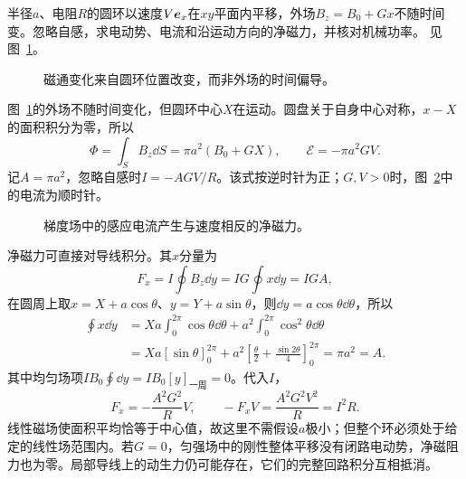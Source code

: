 \begin{exercise}[在静态梯度磁场中平移的圆环]\label{ex:i1-h13}
半径$a$、电阻$R$的圆环以速度$V\bm{e}_x$在$xy$平面内平移，外场$B_z=B_0+Gx$不随时间变。忽略自感，求电动势、电流和沿运动方向的净磁力，并核对机械功率。 见图~\ref{fig:i1-h13-q}。
\end{exercise}

\begin{figure}[H]\centering
{}
\caption{磁通变化来自圆环位置改变，而非外场的时间偏导。}\label{fig:i1-h13-q}
\end{figure}
\begin{solution}
图~\ref{fig:i1-h13-q}的外场不随时间变化，但圆环中心$X$在运动。圆盘关于自身中心对称，$x-X$的面积积分为零，所以
\[\Phi=\int_SB_z\dd S=\pi a^2(B_0+GX),\qquad
\mathcal E=-\pi a^2GV.
\]
记$A=\pi a^2$，忽略自感时$I=-AGV/R$。该式按逆时针为正；$G,V>0$时，图~\ref{fig:i1-h13-s}中的电流为顺时针。


\begin{figure}[H]\centering
{}
\caption{梯度场中的感应电流产生与速度相反的净磁力。}\label{fig:i1-h13-s}
\end{figure}

净磁力可直接对导线积分。其$x$分量为
\[F_x=I\oint B_z\dd y
=IG\oint x\dd y=IGA,
\]
在圆周上取$x=X+a\cos\theta$、$y=Y+a\sin\theta$，则$\dd y=a\cos\theta\dd\theta$，所以
\[\begin{aligned}
\oint x\dd y
&=Xa\int_0^{2\pi}\cos\theta\dd\theta
+a^2\int_0^{2\pi}\cos^2\theta\dd\theta\\
&=Xa[\sin\theta]_0^{2\pi}
+a^2\left[\frac\theta2+\frac{\sin2\theta}4\right]_0^{2\pi}
=\pi a^2=A.
\end{aligned}\]
其中均匀场项$IB_0\oint\dd y=IB_0[y]_{\text{一周}}=0$。代入$I$，
\[\boxed{F_x=-\frac{A^2G^2}{R}V},\qquad
-F_xV=\frac{A^2G^2V^2}{R}=I^2R.
\]
线性磁场使面积平均恰等于中心值，故这里不需假设$a$极小；但整个环必须处于给定的线性场范围内。若$G=0$，匀强场中的刚性整体平移没有闭路电动势，净磁阻力也为零。局部导线上的动生力仍可能存在，它们的完整回路积分互相抵消。
\end{solution}


